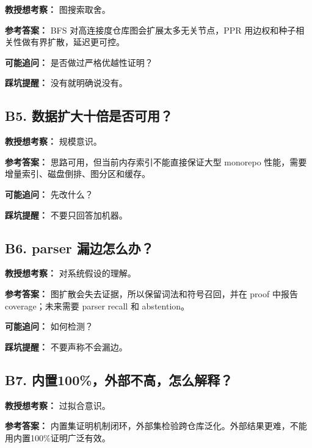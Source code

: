 \documentclass[UTF8,12pt,openany]{ctexbook}
\begin{document}
\textbf{教授想考察：} 图搜索取舍。\par

\textbf{参考答案：} BFS 对高连接度仓库图会扩展太多无关节点，PPR 用边权和种子相关性做有界扩散，延迟更可控。\par

\textbf{可能追问：} 是否做过严格优越性证明？\par

\textbf{踩坑提醒：} 没有就明确说没有。\par

\subsection{B5. 数据扩大十倍是否可用？}

\textbf{教授想考察：} 规模意识。\par

\textbf{参考答案：} 思路可用，但当前内存索引不能直接保证大型 monorepo 性能，需要增量索引、磁盘倒排、图分区和缓存。\par

\textbf{可能追问：} 先改什么？\par

\textbf{踩坑提醒：} 不要只回答加机器。\par

\subsection{B6. parser 漏边怎么办？}

\textbf{教授想考察：} 对系统假设的理解。\par

\textbf{参考答案：} 图扩散会失去证据，所以保留词法和符号召回，并在 proof 中报告 coverage；未来需要 parser recall 和 abstention。\par

\textbf{可能追问：} 如何检测？\par

\textbf{踩坑提醒：} 不要声称不会漏边。\par

\subsection{B7. 内置100\%，外部不高，怎么解释？}

\textbf{教授想考察：} 过拟合意识。\par

\textbf{参考答案：} 内置集证明机制闭环，外部集检验跨仓库泛化。外部结果更难，不能用内置100\%证明广泛有效。\par
\end{document}
